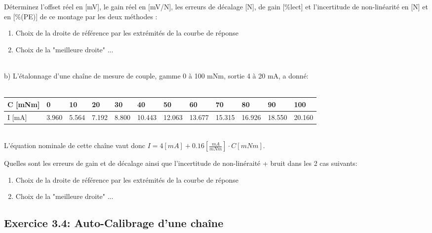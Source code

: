 \documentclass[main.tex]{subfiles}
\begin{document}
Déterminez l'offset réel en [mV], le gain réel en [mV/N], les erreurs de décalage [N], de gain [\%lect] et l'incertitude de non-linéarité en [N] et en [\%(PE)] de ce montage par les deux méthodes :
\begin{enumerate}
    \item Choix de la droite de référence par les extrémités de la courbe de réponse
    \item Choix de la "meilleure droite"	 ...
\end{enumerate}
~\\

b)	L'étalonnage d'une chaîne de mesure de couple, gamme 0 à 100 mNm, sortie 4 à 20 mA, a donné: \\
~
\\
\begin{tabular}{|l|l|l|l|l|l|l|l|l|l|l|l|}
    \hline
    \footnotesize C [mNm] & 0                    & 10                   & 20                   & 30                   & 40                    & 50                    & 60                    & 70                    & 80                    & 90                    & 100                   \\
    \hline

    \footnotesize I [mA]  & \footnotesize  3.960 & \footnotesize  5.564 & \footnotesize  7.192 & \footnotesize  8.800 & \footnotesize  10.443 & \footnotesize  12.063 & \footnotesize  13.677 & \footnotesize  15.315 & \footnotesize  16.926 & \footnotesize  18.550 & \footnotesize  20.160 \\
    \hline
\end{tabular}
\\

L'équation nominale de cette chaîne vaut donc $I = 4 [mA] + 0.16 [\frac{mA}{mNm}]  \cdot C [mNm]$.

Quelles sont les erreurs de gain et de décalage ainsi que l'incertitude de non-linéraité + bruit dans les 2 cas suivants:
\begin{enumerate}
    \item Choix de la droite de référence par les extrémités de la courbe de réponse
    \item Choix de la "meilleure droite"	 ...
\end{enumerate}

\subsection*{Exercice 3.4: Auto-Calibrage d'une chaîne}
\end{document}
